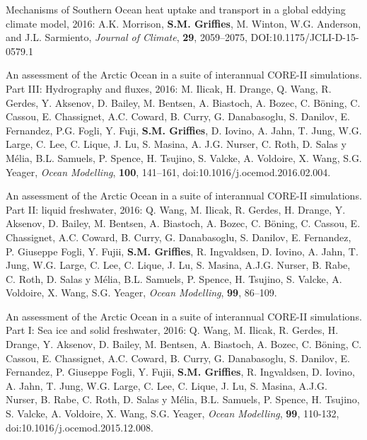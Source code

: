 \begin{etaremune}
\item Mechanisms of Southern Ocean heat uptake and transport in a
  global eddying climate model, 2016: A.K. Morrison, {\bf
    S.M. Grif\/f\/ies}, M. Winton, W.G. Anderson, and J.L. Sarmiento,
  {\it Journal of Climate}, {\bf 29}, 2059--2075,
  DOI:10.1175/JCLI-D-15-0579.1

\item An assessment of the Arctic Ocean in a suite of interannual
  CORE-II simulations. Part III: Hydrography and fluxes, 2016:
  M. Ilicak, H. Drange, Q. Wang, R. Gerdes, Y. Aksenov, D. Bailey,
  M. Bentsen, A. Biastoch, A. Bozec, C. B\"{o}ning, C. Cassou,
  E. Chassignet, A.C. Coward, B. Curry, G. Danabasoglu, S. Danilov,
  E. Fernandez, P.G. Fogli, Y. Fuji, {\bf S.M. Grif\/f\/ies},
  D. Iovino, A. Jahn, T. Jung, W.G. Large, C. Lee, C. Lique, J. Lu,
  S. Masina, A. J.G. Nurser, C. Roth, D. Salas y M\'{e}lia,
  B.L. Samuels, P. Spence, H. Tsujino, S. Valcke, A. Voldoire,
  X. Wang, S.G. Yeager, {\it Ocean Modelling}, {\bf 100}, 141--161,
  doi:10.1016/j.ocemod.2016.02.004.

\item An assessment of the Arctic Ocean in a suite of interannual
  CORE-II simulations. Part II: liquid freshwater, 2016: Q. Wang,
  M. Ilicak, R. Gerdes, H. Drange, Y. Aksenov, D. Bailey, M. Bentsen,
  A. Biastoch, A. Bozec, C. B\"{o}ning, C.  Cassou, E. Chassignet,
  A.C. Coward, B. Curry, G. Danabasoglu, S. Danilov, E. Fernandez,
  P. Giuseppe Fogli, Y. Fujii, {\bf S.M. Grif\/f\/ies}, R. Ingvaldsen,
  D. Iovino, A. Jahn, T. Jung, W.G. Large, C. Lee, C. Lique, J. Lu,
  S. Masina, A.J.G. Nurser, B. Rabe, C. Roth, D. Salas y M\'elia,
  B.L. Samuels, P. Spence, H. Tsujino, S. Valcke, A. Voldoire,
  X. Wang, S.G. Yeager, {\it Ocean Modelling}, {\bf 99}, 86--109.

\item An assessment of the Arctic Ocean in a suite of interannual
  CORE-II simulations. Part I: Sea ice and solid freshwater, 2016:
  Q. Wang, M. Ilicak, R. Gerdes, H. Drange, Y. Aksenov, D. Bailey,
  M. Bentsen, A. Biastoch, A. Bozec, C. B\"{o}ning, C.  Cassou,
  E. Chassignet, A.C. Coward, B. Curry, G. Danabasoglu, S. Danilov,
  E. Fernandez, P. Giuseppe Fogli, Y. Fujii, {\bf S.M. Grif\/f\/ies},
  R. Ingvaldsen, D. Iovino, A. Jahn, T. Jung, W.G. Large, C. Lee,
  C. Lique, J. Lu, S. Masina, A.J.G. Nurser, B. Rabe, C. Roth,
  D. Salas y M\'elia, B.L. Samuels, P. Spence, H. Tsujino, S. Valcke,
  A. Voldoire, X. Wang, S.G. Yeager, {\it Ocean Modelling}, {\bf 99},
  110-132, doi:10.1016/j.ocemod.2015.12.008.


\end{etaremune}
